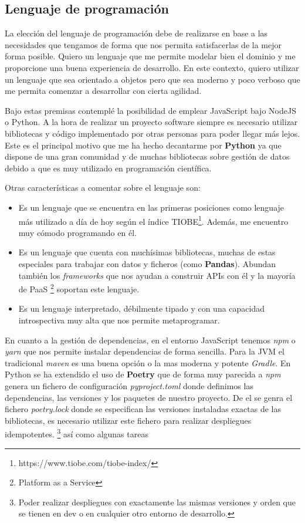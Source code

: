\subsection{Lenguaje de programación}
La elección del lenguaje de programación debe de realizarse en base a las necesidades que
tengamos de forma que nos permita satisfacerlas de la mejor forma posible. Quiero un
lenguaje que me permite modelar bien el dominio y me proporcione una buena experiencia de
desarrollo. En este contexto, quiero utilizar un lenguaje que sea orientado a objetos pero
que sea moderno y poco verboso que me permita comenzar a desarrollar con cierta agilidad.

Bajo estas premisas contemplé la posibilidad de emplear JavaScript bajo NodeJS o Python. A
la hora de realizar un proyecto software siempre es necesario utilizar bibliotecas y
código implementado por otras personas para poder llegar más lejos. Este es el principal
motivo que me ha hecho decantarme por \textbf{Python} ya que dispone de una gran comunidad
y de muchas bibliotecas sobre gestión de datos debido a que es muy utilizado en
programación científica.

Otras características a comentar sobre el lenguaje son:
\begin{itemize}
    \item Es un lenguaje que se encuentra en las primeras posiciones como lenguaje más
    utilizado a día de hoy según el índice
    TIOBE\footnote{https://www.tiobe.com/tiobe-index/}. Además, me encuentro muy cómodo
    programando en él.
    \item Es un lenguaje que cuenta con muchísimas bibliotecas, muchas de estas especiales
    para trabajar con datos y ficheros (como \textbf{Pandas}). Abundan también los
    \textit{frameworks} que nos ayudan a construir APIs con él y la mayoría de PaaS
    \footnote{Platform as a Service} soportan este lenguaje.
    \item Es un lenguaje interpretado, débilmente tipado y con una capacidad introspectiva
    muy alta que nos permite metaprogramar.
\end{itemize}

En cuanto a la gestión de dependencias, en el entorno JavaScript tenemos \textit{npm} o
\textit{yarn} que nos permite instalar dependencias de forma sencilla. Para la JVM el
tradicional \textit{maven} es una buena opción o la mas moderna y potente \textit{Gradle}.
En Python se ha extendido el uso de \textbf{Poetry} que de forma muy parecida a
\textit{npm} genera un fichero de configuración \textit{pyproject.toml} donde definimos
las dependencias, las versiones y los paquetes de nuestro proyecto. De el se genra el
fichero \textit{poetry.lock} donde se especifican las versiones instaladas exactas de las
bibliotecas, es necesario utilizar este fichero para realizar despliegues idempotentes.
\footnote{Poder realizar despliegues con exactamente las mismas versiones y orden que se
tienen en dev o en cualquier otro entorno de desarrollo.} así como algunas tareas

